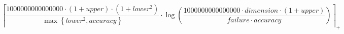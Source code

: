 \[\left\lceil \frac{1000000000000000 \cdot \left(1 + upper\right) \cdot \left(1 + lower^{2}\right)}{\max\left\{ lower^{2}, accuracy \right\}} \cdot \log\left(\frac{1000000000000000 \cdot dimension \cdot \left(1 + upper\right)}{failure \cdot accuracy}\right) \right\rceil_{+}\]
